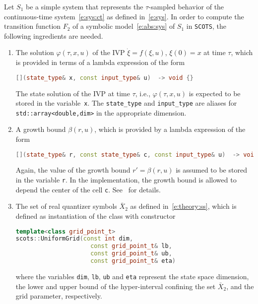 \documentclass[a4paper]{amsart}
\begin{document}
Let $S_1$ be a simple system that represents the $\tau$-sampled
behavior of the continuous-time system~\eqref{e:sys:ct} as defined in~\eqref{e:sys}.
In order to compute the transition function $F_2$ of a symbolic
model~\eqref{e:abs:sys} of $S_1$ in {\tt SCOTS}, the following ingredients are
needed.
\begin{enumerate}
  \item The solution $\varphi(\tau,x,u)$ of the IVP $\dot \xi = f(\xi,u)$,
  $\xi(0)=x$ at time $\tau$, which is provided in terms of a lambda expression
  of the form 
\begin{lstlisting}[basicstyle=\small\ttfamily, language=C++]
[](state_type& x, const input_type& u)  -> void {}
\end{lstlisting}
  The state solution of the IVP at time $\tau$, i.e., $\varphi(\tau,x,u)$ is
  expected to be stored in the variable~{\tt x}. The {\tt state\_type} and
  {\tt\small input\_type} are aliases for {\tt\small std::array<double,dim>} in the appropriate
  dimension.

  \item A growth bound $\beta(r,u)$, which is provided by a lambda expression of
  the form
\begin{lstlisting}[basicstyle=\small\ttfamily, language=C++]
[](state_type& r, const state_type& c, const input_type& u)  -> void {}
\end{lstlisting}
  Again, the value of the growth bound $r'=\beta(r,u)$ is assumed to be stored
  in the variable {\tt r}. In the implementation, the growth bound is allowed
  to depend the center of the cell {\tt c}. See~\cite{WeberRunggerReissig17} for
  details.

  \item The set of real quantizer symbols $\bar X_2$ as defined
  in~\eqref{e:theory:ss}, which is defined as instantiation of the class with constructor
\begin{lstlisting}[basicstyle=\small\ttfamily, language=C++]
template<class grid_point_t>
scots::UniformGrid(const int dim,
                     const grid_point_t& lb,
                     const grid_point_t& ub,
                     const grid_point_t& eta)
\end{lstlisting}
  where the variables {\tt dim}, {\tt lb}, {\tt ub} and {\tt eta} represent the
  state space dimension, the lower and upper bound of the hyper-interval
  confining the set $\bar X_2$, and the grid parameter, respectively.


\end{enumerate}
\end{document}
